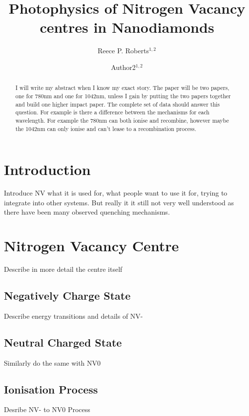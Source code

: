 \documentclass[preprint,prl,twocolumn]{revtex4}
\begin{document}
\title{Photophysics of Nitrogen Vacancy centres in Nanodiamonds}
  
\author{Reece P. Roberts$^{1,2}$}
\author{Author2$^{1,2}$}



\begin{abstract}
I will write my abstract when I know my exact story.
The paper will be two papers, one for 780nm and one for 1042nm, unless I gain by putting the two papers together and build one higher impact paper.
The complete set of data should answer this question.
For example is there a difference between the mechanisms for each wavelength. For example the 780nm can both ionise and recombine, however maybe the 1042nm can only ionise and can't lease to a recombination process.
\end{abstract}

\maketitle

\section{Introduction}
Introduce NV what it is used for, what people want to use it for, trying to integrate into other systems. But really it it still not very well understood as there have been many observed quenching mechanisms. 

\section{Nitrogen Vacancy Centre}
Describe in more detail the centre itself
\subsection{Negatively Charge State}
Describe energy transitions and details of NV-
\subsection{Neutral Charged State}
Similarly do the same with NV0
\subsection{Ionisation Process}
Desribe NV- to NV0 Process
\end{document}
